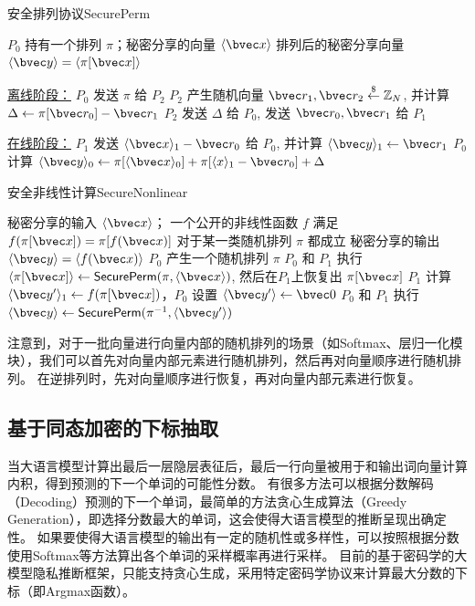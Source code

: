 \begin{algorithm}[H]
    \caption{安全排列协议\textsf{SecurePerm}}
    \label{alg:secure_perm}
    \begin{algorithmic}[1]
    \Require $P_0$ 持有一个排列 $\pi$；秘密分享的向量 $\langle \bvec x \rangle$
    \Ensure 排列后的秘密分享向量 $\langle \bvec y \rangle  = \langle \pi[\bvec x] \rangle$
    \item[\underline{离线阶段：}]
    \State $P_0$ 发送 $\pi$ 给 $P_2$
    \State $P_2$ 产生随机向量 $\bvec r_1, \bvec r_2 \stackrel{\$}{\gets} \mathbb Z_N $, 并计算 $\Delta \gets \pi[\bvec r_0] - \bvec r_1$
    \State $P_2$ 发送 $\Delta$ 给 $P_0$, 发送 $\bvec r_0, \bvec r_1$ 给 $P_1$
    \item[\underline{在线阶段：}]
    \State $P_1$ 发送 $\langle \bvec x \rangle_1 - \bvec r_0$ 给 $P_0$, 并计算 $\langle \bvec y \rangle_1 \gets \bvec r_1$
    \State $P_0$ 计算 $\langle \bvec y \rangle_0 \gets \pi[\langle \bvec x \rangle_0] + \pi[\langle x \rangle_1 - \bvec r_0] + \Delta$
    \end{algorithmic}
\end{algorithm}

\begin{algorithm}[h]
\caption{安全非线性计算\textsf{SecureNonlinear}}
\label{alg:perm-llm:nonlinear}
\begin{algorithmic}[1]
\Require  
    秘密分享的输入 $\langle \bvec x \rangle$；
    一个公开的非线性函数 $f$ 满足 $f(\pi[\bvec x]) = \pi[f(\bvec x)]$ 对于某一类随机排列 $\pi$ 都成立
\Ensure 秘密分享的输出 $\langle \bvec y \rangle = \langle f(\bvec x) \rangle$
\State $P_0$ 产生一个随机排列 $\pi$
\State $P_0$ 和 $P_1$ 执行 $\langle \pi[\bvec x] \rangle \gets \mathsf{SecurePerm}(\pi, \langle \bvec x \rangle)$, 然后在$P_1$上恢复出 $\pi[\bvec x]$
\State $P_1$ 计算 $\langle \bvec y' \rangle_1 \gets f(\pi[\bvec x])$，$P_0$ 设置 $\langle \bvec y' \rangle \gets \bvec 0$
\State $P_0$ 和 $P_1$ 执行 $\langle \bvec y \rangle \gets \mathsf{SecurePerm}(\pi^{-1}, \langle \bvec y' \rangle)$
\end{algorithmic}
\end{algorithm}

注意到，对于一批向量进行向量内部的随机排列的场景（如Softmax、层归一化模块），我们可以首先对向量内部元素进行随机排列，然后再对向量顺序进行随机排列。
%
在逆排列时，先对向量顺序进行恢复，再对向量内部元素进行恢复。
%

\subsection{基于同态加密的下标抽取}
当大语言模型计算出最后一层隐层表征后，最后一行向量被用于和输出词向量计算内积，得到预测的下一个单词的可能性分数。
%
有很多方法可以根据分数解码（Decoding）预测的下一个单词，最简单的方法贪心生成算法（Greedy Generation），即选择分数最大的单词，这会使得大语言模型的推断呈现出确定性。
%
如果要使得大语言模型的输出有一定的随机性或多样性，可以按照根据分数使用Softmax等方法算出各个单词的采样概率再进行采样。
%
目前的基于密码学的大模型隐私推断框架，只能支持贪心生成，采用特定密码学协议来计算最大分数的下标（即Argmax函数）。
%

